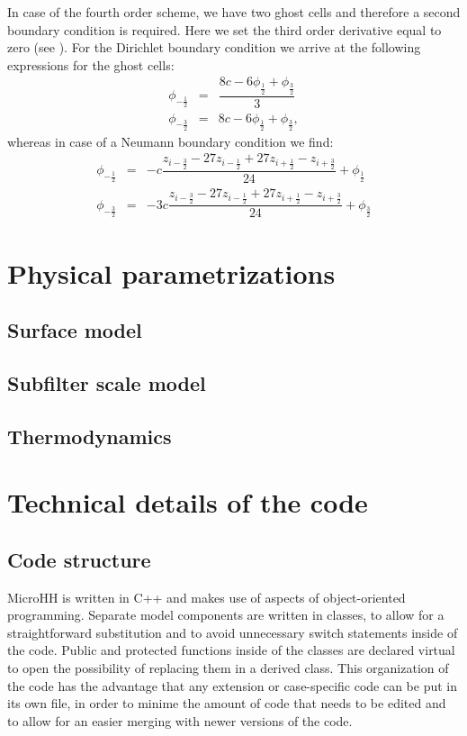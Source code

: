 \documentclass[gmd]{copernicus}
\begin{document}
In case of the fourth order scheme, we have two ghost cells and therefore a second boundary condition is required. Here we set the third order derivative equal to zero (see \citet{Morinishi1998}). For the Dirichlet boundary condition we arrive at the following expressions for the ghost cells:
\begin{eqnarray}
\phi_{-\frac{1}{2}} & = & \dfrac{8 c - 6 \phi_{\frac{1}{2}} + \phi_{\frac{3}{2}}}{3} \\
\phi_{-\frac{3}{2}} & = & 8 c - 6 \phi_{\frac{1}{2}} + \phi_{\frac{3}{2}},
\end{eqnarray}
whereas in case of a Neumann boundary condition we find:
\begin{eqnarray}
\phi_{-\frac{1}{2}} & = & -c  \dfrac{z_{i-\frac{3}{2}} - 27 z_{i-\frac{1}{2}} + 27 z_{i+\frac{1}{2}} - z_{i+\frac{3}{2}}}{24} + \phi_{\frac{1}{2}} \\
\phi_{-\frac{3}{2}} & = & -3c \dfrac{z_{i-\frac{3}{2}} - 27 z_{i-\frac{1}{2}} + 27 z_{i+\frac{1}{2}} - z_{i+\frac{3}{2}}}{24} + \phi_{\frac{3}{2}}
\end{eqnarray}

\section{Physical parametrizations}
\subsection{Surface model}
\subsection{Subfilter scale model}
\subsection{Thermodynamics}

\section{Technical details of the code}\label{sec:technical}
\subsection{Code structure}
MicroHH is written in C++ and makes use of aspects of object-oriented programming. Separate model components are written in classes, to allow for a straightforward substitution and to avoid unnecessary switch statements inside of the code. Public and protected functions inside of the classes are declared virtual to open the possibility of replacing them in a derived class. This organization of the code has the advantage that any extension or case-specific code can be put in its own file, in order to minime the amount of code that needs to be edited and to allow for an easier merging with newer versions of the code.
\end{document}
